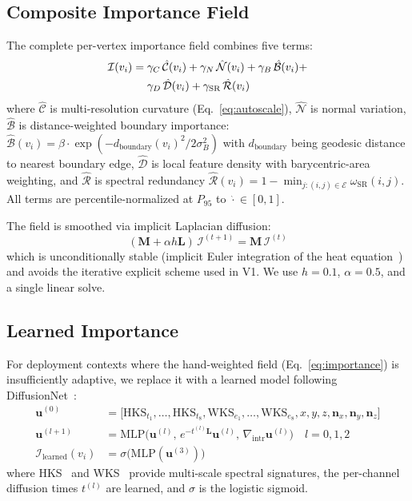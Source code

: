 \documentclass[10pt, twocolumn, a4paper]{article}
\newcommand{\vect}[1]{\bm{#1}}
\newcommand{\mat}[1]{\mathbf{#1}}
\begin{document}
\subsection{Composite Importance Field}
\label{sec:composite}

The complete per-vertex importance field combines five terms:
\begin{align}
  \label{eq:importance}
  \mathcal{I}(v_i) = \;&\gamma_C \,\hat{\mathcal{C}}(v_i) +
  \gamma_N \,\hat{\mathcal{N}}(v_i) +
  \gamma_B \,\hat{\mathcal{B}}(v_i) + \notag \\
  &\gamma_D \,\hat{\mathcal{D}}(v_i) +
  \gamma_{\text{SR}} \,\hat{\mathcal{R}}(v_i)
\end{align}
where $\hat{\mathcal{C}}$ is multi-resolution curvature (Eq.~\ref{eq:autoscale}),
$\hat{\mathcal{N}}$ is normal variation,
$\hat{\mathcal{B}}$ is distance-weighted boundary importance:
$\hat{\mathcal{B}}(v_i) = \beta \cdot \exp(-d_{\text{boundary}}(v_i)^2 /
2\sigma_B^2)$ with $d_{\text{boundary}}$ being geodesic distance to
nearest boundary edge, $\hat{\mathcal{D}}$ is local feature density
with barycentric-area weighting, and
$\hat{\mathcal{R}}$ is spectral redundancy
$\hat{\mathcal{R}}(v_i) = 1 - \min_{j: (i,j) \in \mathcal{E}}
\omega_{\text{SR}}(i,j)$. All terms are percentile-normalized at
$P_{95}$ to $\hat{\cdot} \in [0,1]$.

The field is smoothed via implicit Laplacian diffusion:
\begin{equation}
  \label{eq:implicit_smooth}
  (\mat{M} + \alpha h \mat{L}) \, \mathcal{I}^{(t+1)} =
  \mat{M} \, \mathcal{I}^{(t)}
\end{equation}
which is unconditionally stable (implicit Euler integration of the
heat equation~\cite{desbrun1999implicit}) and avoids the iterative
explicit scheme used in V1. We use $h = 0.1$, $\alpha = 0.5$, and a
single linear solve.

\subsection{Learned Importance}
\label{sec:learned}

For deployment contexts where the hand-weighted field
(Eq.~\ref{eq:importance}) is insufficiently adaptive, we replace it
with a learned model following DiffusionNet~\cite{sharp2022diffusionnet}:
\begin{align}
  \label{eq:diffusionnet}
  \vect{u}^{(0)} &=
  \big[\text{HKS}_{t_1},\dots,\text{HKS}_{t_8},
        \text{WKS}_{e_1},\dots,\text{WKS}_{e_8},
        x,y,z, \vect{n}_x,\vect{n}_y,\vect{n}_z\big] \\
  \vect{u}^{(l+1)} &=
  \text{MLP}\big(\vect{u}^{(l)},\,
    e^{-t^{(l)}\mat{L}}\vect{u}^{(l)},\,
    \nabla_{\text{intr}}\vect{u}^{(l)}\big)
    \quad l = 0, 1, 2 \\
  \mathcal{I}_{\text{learned}}(v_i) &=
  \sigma\!\big(\text{MLP}(\vect{u}^{(3)})\big)
\end{align}
where HKS~\cite{sun2009concise} and WKS~\cite{aubry2011wave} provide
multi-scale spectral signatures, the per-channel diffusion times
$t^{(l)}$ are learned, and $\sigma$ is the logistic sigmoid.
\end{document}
